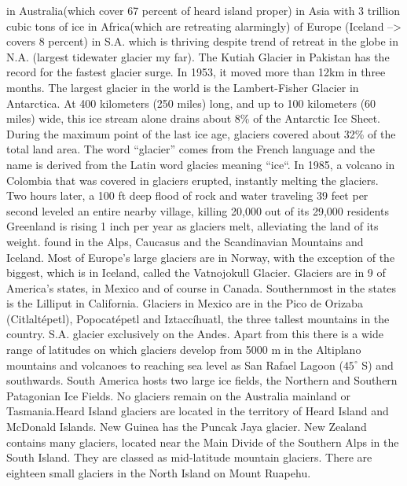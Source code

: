 		     in Australia(which cover 67 percent of heard island proper)
		     in Asia with 3 trillion cubic tons of ice
		     in Africa(which are retreating alarmingly)
		     of Europe (Iceland --> covers 8 percent)
		     in S.A. which is thriving despite trend of retreat in the globe
		     in N.A. (largest tidewater glacier my far). 
		     The Kutiah Glacier in Pakistan has the record for the fastest glacier surge. In 1953, it moved more than 12km in three months.
		     The largest glacier in the world is the Lambert-Fisher Glacier in Antarctica. At 400 kilometers (250 miles) long, and up to 100 kilometers (60 miles) wide, this ice stream alone drains about 8\% of the Antarctic Ice Sheet.
		     During the maximum point of the last ice age, glaciers covered about 32\% of the total land area.
		    \ddd The word “glacier” comes from the French language and the name is derived from the Latin word glacies meaning “ice“.
		     In 1985, a volcano in Colombia that was covered in glaciers erupted, instantly melting the glaciers. Two hours later, a 100 ft deep flood of rock and water traveling 39 feet per second leveled an entire nearby village, killing 20,000 out of its 29,000 residents
		      Greenland is rising 1 inch per year as glaciers melt, alleviating the land of its weight. 
		     found in the Alps, Caucasus and the Scandinavian Mountains and Iceland. Most of Europe's large glaciers are in Norway, with the exception of the biggest, which is in Iceland, called the Vatnojokull Glacier.
		     Glaciers are in 9 of America's states, in Mexico and of course in Canada. Southernmost in the states is the Lilliput in California. Glaciers in Mexico are in the Pico de Orizaba (Citlaltépetl), Popocatépetl and Iztaccíhuatl, the three tallest mountains in the country.
		     S.A. glacier exclusively on the Andes. Apart from this there is a wide range of latitudes on which glaciers develop from 5000 m in the Altiplano mountains and volcanoes to reaching sea level as San Rafael Lagoon ($ 45^\circ $ S) and southwards. South America hosts two large ice fields, the Northern and Southern Patagonian Ice Fields.
		     No glaciers remain on the Australia mainland or Tasmania.Heard Island glaciers are located in the territory of Heard Island and McDonald Islands. New Guinea has the Puncak Jaya glacier. New Zealand contains many glaciers,  located near the Main Divide of the Southern Alps in the South Island. They are classed as mid-latitude mountain glaciers. There are eighteen small glaciers in the North Island on Mount Ruapehu.
